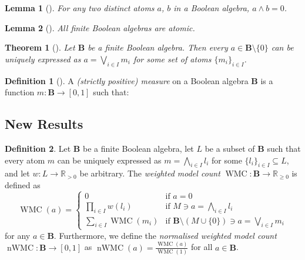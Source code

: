 \documentclass{article}
\newtheorem{theorem}{Theorem}
\newtheorem{lemma}{Lemma}
\theoremstyle{definition}
\newtheorem{definition}{Definition}
\theoremstyle{remark}
\DeclareMathOperator{\WMC}{WMC}
\DeclareMathOperator{\nWMC}{nWMC}
\begin{document}
\begin{lemma}[\cite{ganesh2006introduction}]
  For any two distinct atoms $a$, $b$ in a Boolean algebra, $a \land b = 0$.
\end{lemma}

\begin{lemma}[\cite{givant2008introduction}]
  All finite Boolean algebras are atomic.
\end{lemma}

\begin{theorem}[\cite{ganesh2006introduction}] \label{thm:representation}
  Let $\mathbf{B}$ be a finite Boolean algebra. Then every $a \in \mathbf{B}
  \setminus \{ 0 \}$ can be uniquely expressed as $a = \bigvee_{i \in I} m_i$
  for some set of atoms $\{m_i\}_{i \in I}$.
\end{theorem}

\begin{definition}[\cite{gaifman1964concerning}] \label{def:measure}
  A \emph{(strictly positive) measure} on a Boolean algebra $\mathbf{B}$ is a
  function $m : \mathbf{B} \to [0, 1]$ such that:
\end{definition}

\subsection{New Results}

\begin{definition}
  Let $\mathbf{B}$ be a finite Boolean algebra, let $L$ be a subset of
  $\mathbf{B}$ such that every atom $m$ can be uniquely expressed as $m =
  \bigwedge_{i \in I} l_i$ for some $\{ l_i \}_{i \in I} \subseteq L$, and let
  $w : L \to \mathbb{R}_{>0}$ be arbitrary. The \emph{weighted model count}
  $\WMC : \mathbf{B} \to \mathbb{R}_{\ge 0}$ is defined as
  \[
    \WMC(a) = \begin{cases}
      0 & \text{if } a = 0 \\
      \prod_{i \in I} w(l_i) & \text{if } M \ni a = \bigwedge_{i \in I} l_i \\
      \sum_{i \in I} \WMC(m_i) & \text{if } \mathbf{B} \setminus (M \cup \{ 0
      \}) \ni a = \bigvee_{i \in I} m_i
    \end{cases}
  \]
  for any $a \in \mathbf{B}$. Furthermore, we define the \emph{normalised
    weighted model count} $\nWMC : \mathbf{B} \to [0, 1]$ as $\nWMC(a) =
  \frac{\WMC(a)}{\WMC(1)}$ for all $a \in \mathbf{B}$.
\end{definition}
\end{document}
